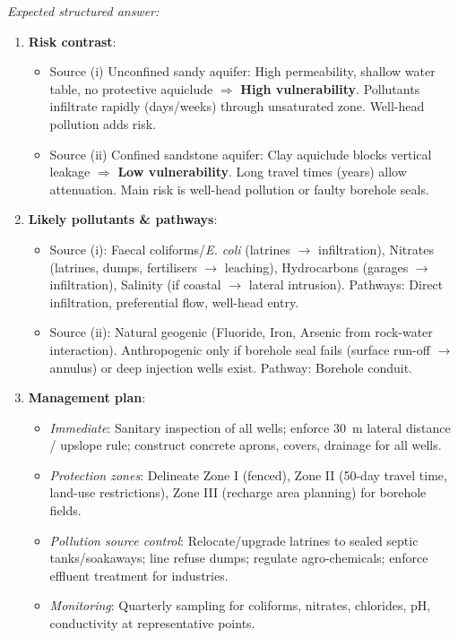 \documentclass[11pt]{article}
\begin{document}
\begin{corrige}[Exercise 1]
\emph{Expected structured answer:}
\begin{enumerate}
\item \textbf{Risk contrast}: 
\begin{itemize}
\item Source (i) Unconfined sandy aquifer: High permeability, shallow water table, no protective aquiclude $\Rightarrow$ \textbf{High vulnerability}. Pollutants infiltrate rapidly (days/weeks) through unsaturated zone. Well-head pollution adds risk.
\item Source (ii) Confined sandstone aquifer: Clay aquiclude blocks vertical leakage $\Rightarrow$ \textbf{Low vulnerability}. Long travel times (years) allow attenuation. Main risk is well-head pollution or faulty borehole seals.
\end{itemize}
\item \textbf{Likely pollutants \& pathways}:
\begin{itemize}
\item Source (i): Faecal coliforms/\emph{E. coli} (latrines $\rightarrow$ infiltration), Nitrates (latrines, dumps, fertilisers $\rightarrow$ leaching), Hydrocarbons (garages $\rightarrow$ infiltration), Salinity (if coastal $\rightarrow$ lateral intrusion). Pathways: Direct infiltration, preferential flow, well-head entry.
\item Source (ii): Natural geogenic (Fluoride, Iron, Arsenic from rock-water interaction). Anthropogenic only if borehole seal fails (surface run-off $\rightarrow$ annulus) or deep injection wells exist. Pathway: Borehole conduit.
\end{itemize}
\item \textbf{Management plan}:
\begin{itemize}
\item \emph{Immediate}: Sanitary inspection of all wells; enforce \SI{30}{m} lateral distance / upslope rule; construct concrete aprons, covers, drainage for all wells.
\item \emph{Protection zones}: Delineate Zone I (fenced), Zone II (50-day travel time, land-use restrictions), Zone III (recharge area planning) for borehole fields.
\item \emph{Pollution source control}: Relocate/upgrade latrines to sealed septic tanks/soakaways; line refuse dumps; regulate agro-chemicals; enforce effluent treatment for industries.
\item \emph{Monitoring}: Quarterly sampling for coliforms, nitrates, chlorides, pH, conductivity at representative points.

\end{itemize}
\end{enumerate}
\end{corrige}
\end{document}
